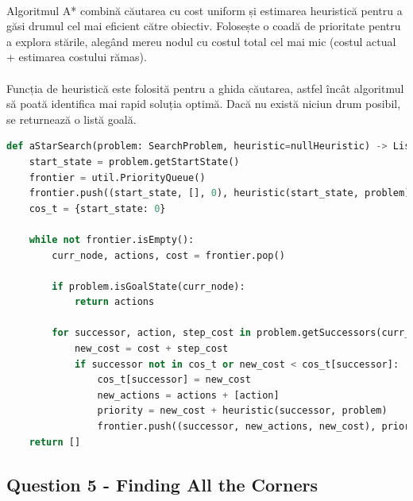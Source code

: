 \documentclass[12pt]{article}
\begin{document}
    \paragraph{}
Algoritmul A* combină căutarea cu cost uniform și estimarea heuristică pentru a găsi drumul cel mai eficient către obiectiv. Folosește o coadă de prioritate pentru a explora stările, alegând mereu nodul cu costul total cel mai mic (costul actual + estimarea costului rămas).
    \paragraph{}
     Funcția de heuristică este folosită pentru a ghida căutarea, astfel încât algoritmul să poată identifica mai rapid soluția optimă. Dacă nu există niciun drum posibil, se returnează o listă goală.

    \begin{lstlisting}[language=Python]
def aStarSearch(problem: SearchProblem, heuristic=nullHeuristic) -> List[Directions]:
    start_state = problem.getStartState()
    frontier = util.PriorityQueue()
    frontier.push((start_state, [], 0), heuristic(start_state, problem))
    cos_t = {start_state: 0}

    while not frontier.isEmpty():
        curr_node, actions, cost = frontier.pop()

        if problem.isGoalState(curr_node):
            return actions

        for successor, action, step_cost in problem.getSuccessors(curr_node):
            new_cost = cost + step_cost
            if successor not in cos_t or new_cost < cos_t[successor]:
                cos_t[successor] = new_cost
                new_actions = actions + [action]
                priority = new_cost + heuristic(successor, problem)
                frontier.push((successor, new_actions, new_cost), priority)
    return []
    \end{lstlisting}
	\subsection{Question 5 - Finding All the Corners}
\end{document}
